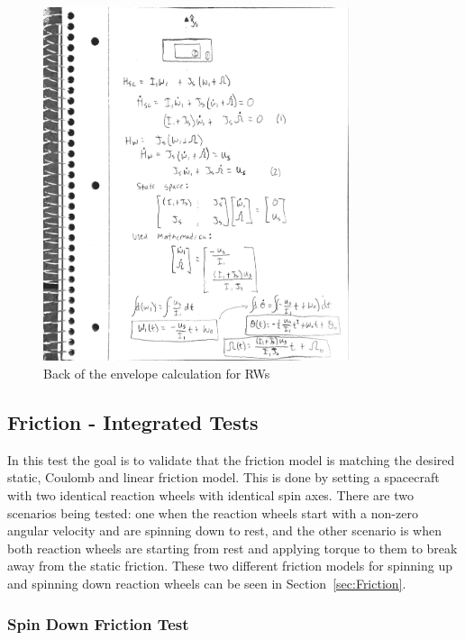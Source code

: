 \begin{figure}[htbp]
	\centerline{
		\includegraphics[width=0.8\textwidth]{Figures/BOE}}
	\caption{Back of the envelope calculation for RWs}
	\label{fig:BOE}
\end{figure}

\clearpage

\subsection{Friction - Integrated Tests}

In this test the goal is to validate that the friction model is matching the desired static, Coulomb and linear friction model. This is done by setting a spacecraft with two identical reaction wheels with identical spin axes. There are two scenarios being tested: one when the reaction wheels start with a non-zero angular velocity and are spinning down to rest, and the other scenario is when both reaction wheels are starting from rest and applying torque to them to break away from the static friction. These two different friction models for spinning up and spinning down reaction wheels can be seen in Section~\ref{sec:Friction}.

\subsubsection{Spin Down Friction Test}

